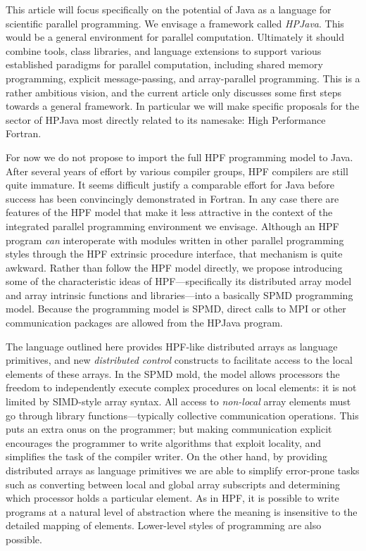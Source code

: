 This article will focus specifically on the potential of Java as a
language for scientific parallel programming.  We envisage a framework
called {\em HPJava}.  This would be a general environment for parallel
computation.  Ultimately it should combine tools, class libraries, and
language extensions to support various established paradigms for
parallel computation, including shared memory programming, explicit
message-passing, and array-parallel programming.  This is a rather
ambitious vision, and the current article only discusses some first
steps towards a general framework.  In particular we will make specific
proposals for the sector of HPJava most directly related to its
namesake: High Performance Fortran.

For now we do not propose to import the full HPF programming model to
Java.  After several years of effort by various compiler groups, HPF
compilers are still quite immature.  It seems difficult justify a
comparable effort for Java before success has been convincingly
demonstrated in Fortran.  In any case there are features of the HPF
model that make it less attractive in the context of the integrated
parallel programming environment we envisage.  Although an HPF program
{\em can} interoperate with modules written in other parallel
programming styles through the HPF extrinsic procedure interface, that
mechanism is quite awkward.  Rather than follow the HPF model directly,
we propose introducing some of the characteristic ideas of
HPF---specifically its distributed array model and array intrinsic
functions and libraries---into a basically SPMD programming model.
Because the programming model is SPMD, direct calls to MPI
\cite{Experiments_HPJava} or other communication packages are allowed
from the HPJava program.

The language outlined here provides HPF-like distributed
arrays as language primitives, and new {\em distributed control}
constructs to facilitate access to the local elements of these arrays.
In the SPMD mold, the model allows processors the freedom to
independently execute complex procedures on local elements: it is not
limited by SIMD-style array syntax.
All access to {\em non-local} array elements must go through
library functions---typically collective communication operations.
This puts an extra onus on the programmer; but making communication
explicit encourages the programmer to write algorithms that exploit
locality, and simplifies the task of the compiler writer.
On the other hand, by providing distributed arrays as language
primitives we are able to simplify error-prone tasks
such as converting between local and global array subscripts and
determining which processor holds a particular element.
As in HPF, it is possible to write programs at a natural level of
abstraction where the meaning is insensitive to the detailed mapping of
elements.  Lower-level styles of programming are also possible.


